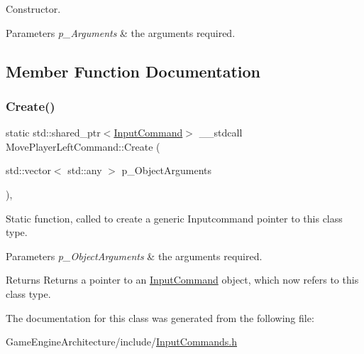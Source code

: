 Constructor. 


\begin{DoxyParams}{Parameters}
{\em p\+\_\+\+Arguments} & the arguments required. \\
\hline
\end{DoxyParams}


\subsection{Member Function Documentation}
\mbox{\label{class_move_player_left_command_af905db38ba4b857598b050cbd8bf2667}} 
\subsubsection{\texorpdfstring{Create()}{Create()}}
{\footnotesize\ttfamily static std\+::shared\+\_\+ptr$<$\mbox{\hyperlink{class_input_command}{Input\+Command}}$>$ \+\_\+\+\_\+stdcall Move\+Player\+Left\+Command\+::\+Create (\begin{DoxyParamCaption}\item[{std\+::vector$<$ std\+::any $>$}]{p\+\_\+\+Object\+Arguments }\end{DoxyParamCaption})\hspace{0.3cm}{\ttfamily [inline]}, {\ttfamily [static]}}



Static function, called to create a generic Inputcommand pointer to this class type. 


\begin{DoxyParams}{Parameters}
{\em p\+\_\+\+Object\+Arguments} & the arguments required. \\
\hline
\end{DoxyParams}
\begin{DoxyReturn}{Returns}
Returns a pointer to an \mbox{\hyperlink{class_input_command}{Input\+Command}} object, which now refers to this class type. 
\end{DoxyReturn}


The documentation for this class was generated from the following file\+:\begin{DoxyCompactItemize}
\item 
Game\+Engine\+Architecture/include/\mbox{\hyperlink{_input_commands_8h}{Input\+Commands.\+h}}\end{DoxyCompactItemize}
